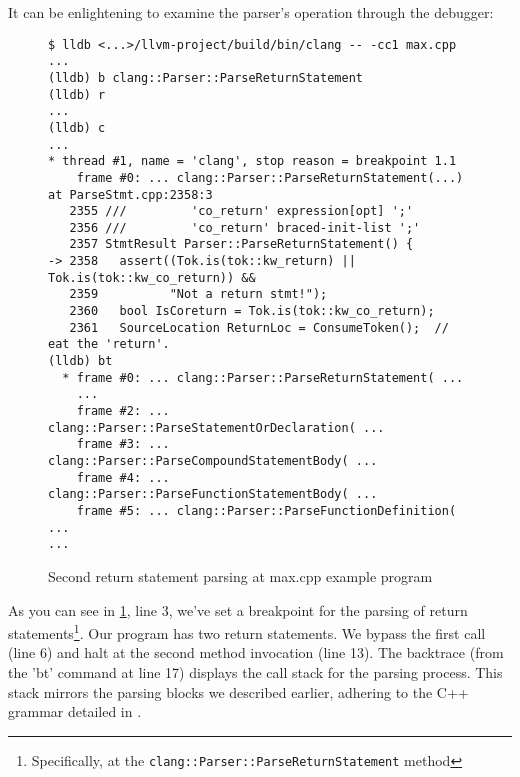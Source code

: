 It can be enlightening to examine the parser's operation through the \lldb
debugger: 
\begin{figure}[H]
\begin{verbatim}
$ lldb <...>/llvm-project/build/bin/clang -- -cc1 max.cpp
...  
(lldb) b clang::Parser::ParseReturnStatement
(lldb) r
...
(lldb) c
...
* thread #1, name = 'clang', stop reason = breakpoint 1.1
    frame #0: ... clang::Parser::ParseReturnStatement(...) at ParseStmt.cpp:2358:3
   2355 ///         'co_return' expression[opt] ';'
   2356 ///         'co_return' braced-init-list ';'
   2357 StmtResult Parser::ParseReturnStatement() {
-> 2358   assert((Tok.is(tok::kw_return) || Tok.is(tok::kw_co_return)) &&
   2359          "Not a return stmt!");
   2360   bool IsCoreturn = Tok.is(tok::kw_co_return);
   2361   SourceLocation ReturnLoc = ConsumeToken();  // eat the 'return'.
(lldb) bt
  * frame #0: ... clang::Parser::ParseReturnStatement( ...
    ... 
    frame #2: ... clang::Parser::ParseStatementOrDeclaration( ...
    frame #3: ... clang::Parser::ParseCompoundStatementBody( ...
    frame #4: ... clang::Parser::ParseFunctionStatementBody( ...
    frame #5: ... clang::Parser::ParseFunctionDefinition( ...
...
\end{verbatim}
\caption{Second return statement parsing at max.cpp example program}
\label{fig:lldb_parser}
\end{figure}
As you can see in \cref{fig:lldb_parser}, line 3, we've set a breakpoint for the
parsing of return statements\footnote{Specifically, at the
\texttt{clang::Parser::ParseReturnStatement} method}. Our program has
two return statements. We bypass the first call (line 6) and halt at the second
method invocation (line 13). The backtrace (from the 'bt' command at line 17)
displays the call stack for the parsing process. This stack mirrors the parsing
blocks we described earlier, adhering to the C++ grammar detailed in
\citep[lex.separate]{standard:cpp20}. 


